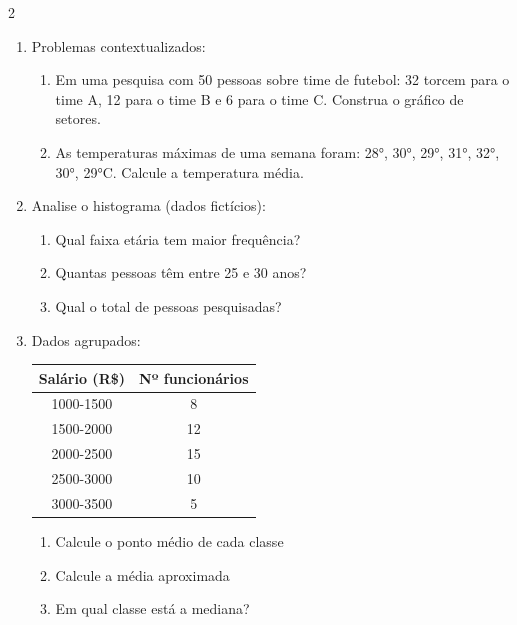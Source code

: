 \documentclass[11pt]{article}
\begin{document}
\begin{multicols}{2}
\begin{enumerate}[leftmargin=*]
\item Problemas contextualizados:
\begin{enumerate}[label=\alph*)]
\item Em uma pesquisa com 50 pessoas sobre time de futebol:
  32 torcem para o time A, 12 para o time B e 6 para o time C.
  Construa o gráfico de setores.
\item As temperaturas máximas de uma semana foram:
  28°, 30°, 29°, 31°, 32°, 30°, 29°C.
  Calcule a temperatura média.
\end{enumerate}

\item Analise o histograma (dados fictícios):
\begin{center}
\end{center}
\begin{enumerate}[label=\alph*)]
\item Qual faixa etária tem maior frequência?
\item Quantas pessoas têm entre 25 e 30 anos?
\item Qual o total de pessoas pesquisadas?
\end{enumerate}

\item Dados agrupados:
\begin{center}
\begin{tabular}{|c|c|}
\hline
\textbf{Salário (R\$)} & \textbf{Nº funcionários} \\
\hline
1000-1500 & 8 \\
1500-2000 & 12 \\
2000-2500 & 15 \\
2500-3000 & 10 \\
3000-3500 & 5 \\
\hline
\end{tabular}
\end{center}
\begin{enumerate}[label=\alph*)]
\item Calcule o ponto médio de cada classe
\item Calcule a média aproximada
\item Em qual classe está a mediana?
\end{enumerate}


\end{enumerate}
\end{multicols}
\end{document}
